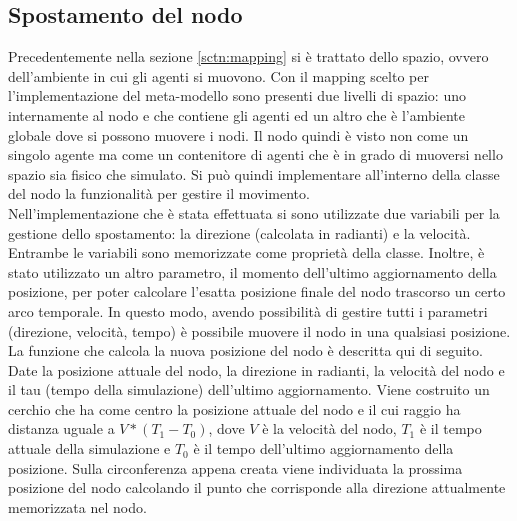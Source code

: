\subsection{Spostamento del nodo}
Precedentemente nella sezione \ref{sctn:mapping} si è trattato dello spazio, ovvero dell'ambiente in cui gli agenti si muovono. Con il mapping scelto per l'implementazione del meta-modello sono presenti due livelli di spazio: uno internamente al nodo e che contiene gli agenti ed un altro che è l'ambiente globale dove si possono muovere i nodi. Il nodo quindi è visto non come un singolo agente ma come un contenitore di agenti che è in grado di muoversi nello spazio sia fisico che simulato. Si può quindi implementare all'interno della classe del nodo la funzionalità per gestire il movimento.
\\
Nell'implementazione che è stata effettuata si sono utilizzate due variabili per la gestione dello spostamento: la direzione (calcolata in radianti) e la velocità. Entrambe le variabili sono memorizzate come proprietà della classe. Inoltre, è stato utilizzato un altro parametro, il momento dell'ultimo aggiornamento della posizione, per poter calcolare l'esatta posizione finale del nodo trascorso un certo arco temporale. In questo modo, avendo possibilità di gestire tutti i parametri (direzione, velocità, tempo) è possibile muovere il nodo in una qualsiasi posizione.
\\
La funzione che calcola la nuova posizione del nodo è descritta qui di seguito. Date la posizione attuale del nodo, la direzione in radianti, la velocità del nodo e il tau (tempo della simulazione) dell'ultimo aggiornamento. Viene costruito un cerchio che ha come centro la posizione attuale del nodo e il cui raggio ha distanza uguale a $V * (T_1 - T_0)$, dove $V$ è la velocità del nodo, $T_1$ è il tempo attuale della simulazione e $T_0$ è il tempo dell'ultimo aggiornamento della posizione. Sulla circonferenza appena creata viene individuata la prossima posizione del nodo calcolando il punto che corrisponde alla direzione attualmente memorizzata nel nodo.

